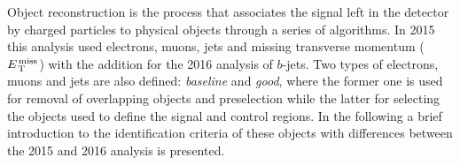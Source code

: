Object reconstruction is the process that associates the signal left in the
detector by charged particles to physical objects through a series of
algorithms. In 2015 this analysis used electrons, muons, jets and missing
transverse momentum ($E_\mathrm{\, T}^\mathrm{\, miss}$) with the addition for the 2016 analysis of
$b$-jets. Two types of electrons, muons and jets are also defined:
\emph{baseline} and \emph{good}, where the former one is used for removal of
overlapping objects and preselection while the latter for selecting the objects
used to define the signal and control regions. In the following a brief
introduction to the identification criteria of these objects with differences
between the 2015 and 2016 analysis is presented.
